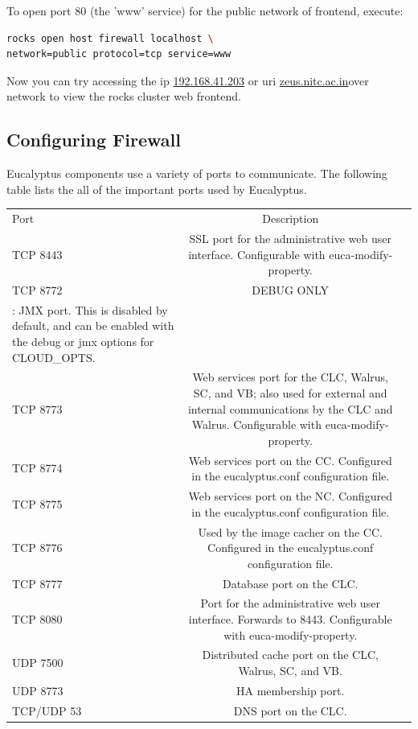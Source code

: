 To open port 80 (the 'www' service) for the public network of frontend,  execute:

\begin{lstlisting}[language=bash]
rocks open host firewall localhost \
network=public protocol=tcp service=www
\end{lstlisting}
Now you can try accessing the ip \url{192.168.41.203} or uri \url{zeus.nitc.ac.in}over network to view the rocks cluster web frontend.

\subsection{Configuring Firewall}

Eucalyptus components use a variety of ports to communicate. The following table lists the all of the important ports used by Eucalyptus.

\begin{center}
\begin{tabular}{ | l | c | r |}
    \hline
Port&Description \\
TCP 8443& SSL port for the administrative web user interface. Configurable with euca-modify-property.\\
TCP 8772&DEBUG ONLY\\: JMX port. This is disabled by default, and can be enabled with the \-\-debug or \-\-jmx options for CLOUD\_OPTS. \\
TCP 8773&Web services port for the CLC, Walrus, SC, and VB; also used for external and internal communications by the CLC and Walrus. Configurable with euca-modify-property.\\
TCP 8774&Web services port on the CC. Configured in the eucalyptus.conf configuration file.\\
TCP 8775&Web services port on the NC. Configured in the eucalyptus.conf configuration file.\\
TCP 8776&Used by the image cacher on the CC. Configured in the eucalyptus.conf configuration file.\\
TCP 8777&Database port on the CLC.\\
TCP 8080&Port for the administrative web user interface. Forwards to 8443. Configurable with euca-modify-property.\\
UDP 7500&Distributed cache port on the CLC, Walrus, SC, and VB.\\
UDP 8773&HA membership port.\\
TCP/UDP 53&DNS port on the CLC.\\
\end{tabular}
\end{center}

